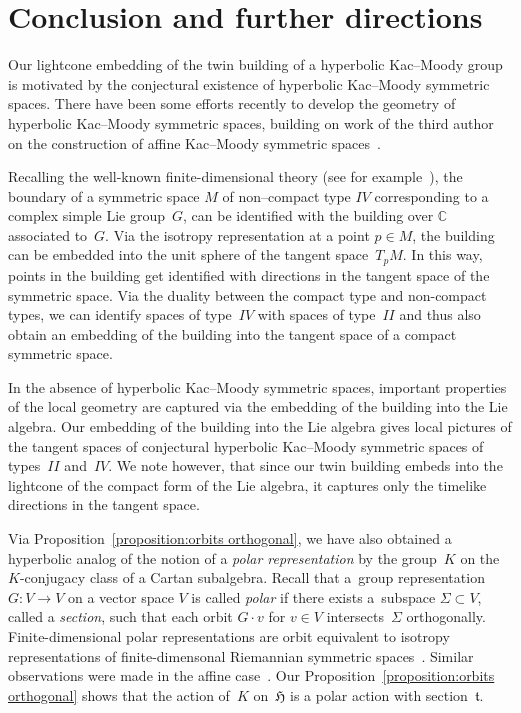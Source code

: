 \documentclass[pdftex]{sigma}
\numberwithin{equation}{section}
\def\fH{\mathfrak{H}}
\def\ft{\mathfrak{t}}
\begin{document}
\section{Conclusion and further directions}

Our lightcone embedding of the twin building of a hyperbolic Kac--Moody group is motivated by the conjectural existence of hyperbolic Kac--Moody symmetric spaces. There have been some efforts recently to develop the geometry of hyperbolic Kac--Moody symmetric spaces, building on work of the third author on the construction of affine Kac--Moody symmetric spaces~\cite{Freyn09, Freyn10b, Freyn10d,Freyn14, Freyn15b, FreynHartnickHornKoehl17}.

Recalling the well-known finite-dimensional theory (see for example~\cite{Eberlein96, Helgason01}), the boundary of a symmetric space $M$ of non--compact type $IV$ corresponding to a complex simple Lie group~$G$, can be identified with the building over $\mathbb{C}$ associated to~$G$. Via the isotropy representation at a point $p\in M$, the building can be embedded into the unit sphere of the tangent space~$T_pM$. In this way, points in the building get identified with directions in the tangent space of the symmetric space. Via the duality between the compact type and non-compact types, we can identify spaces of type~$IV$ with spaces of type~$II$ and thus also obtain an embedding of the building into the tangent space of a compact symmetric space.

In the absence of hyperbolic Kac--Moody symmetric spaces, important properties of the local geometry are captured via the embedding of the building into the Lie algebra. Our embedding of the building into the Lie algebra gives local pictures of the tangent spaces of conjectural hyperbolic Kac--Moody symmetric spaces of types~$II$ and~$IV$. We note however, that since our twin building embeds into the lightcone of the compact form of the Lie algebra, it captures only the timelike directions in the tangent space.

Via Proposition~\ref{proposition:orbits orthogonal}, we have also obtained a hyperbolic analog of the notion of a {\em polar representation} by the group~$K$ on the $K$-conjugacy class of a Cartan subalgebra. Recall that a~group representation $G\colon V\longrightarrow V$ on a vector space $V$ is called {\em polar} if there exists a~subspace $\Sigma\subset V$, called a {\em section}, such that each orbit $G\cdot v$ for $v\in V$ intersects~$\Sigma$ orthogonally. Finite-dimensional polar representations are orbit equivalent to isotropy representations of finite-dimensonal Riemannian symmetric spaces~\cite{Dadok85}. Similar observations were made in the affine case~\cite{Gross00, HPTT}. Our Proposition~\ref{proposition:orbits orthogonal} shows that the action of~$K$ on~$\fH$ is a polar action with section~$\ft$.
\end{document}

